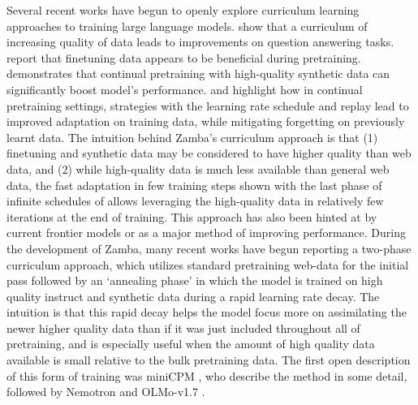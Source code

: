Several recent works have begun to openly explore curriculum learning approaches \citep{elman1993learning,bengio2009curriculum} to training large language models. \citet{liu2018curriculum} show that a curriculum of increasing quality of data leads to improvements on question answering tasks. \citet{krishna2023downstream} report that finetuning data appears to be beneficial during pretraining. \cite{gunasekar2023textbooks} demonstrates that continual pretraining with high-quality synthetic data can significantly boost model's performance.
\citet{gupta2023continual} and \citet{ibrahim2024simple} highlight how in continual pretraining settings, strategies with the learning rate schedule and replay lead to improved adaptation on training data, while mitigating forgetting on previously learnt data. The intuition behind Zamba's curriculum approach is that (1) finetuning and synthetic data may be considered to have higher quality than web data, and (2) while high-quality data is much less available than general web data, the fast adaptation in few training steps shown with the last phase of infinite schedules of \citet{ibrahim2024simple} allows leveraging the high-quality data in relatively few iterations at the end of training. This approach has also been hinted at by current frontier models \citep{team2024gemma,team2023gemini} or \citet{abdin2024phi} as a major method of improving performance. During the development of Zamba, many recent works have begun reporting a two-phase curriculum approach, which utilizes standard pretraining web-data for the initial pass followed by an `annealing phase' in which the model is trained on high quality instruct and synthetic data during a rapid learning rate decay. The intuition is that this rapid decay helps the model focus more on assimilating the newer higher quality data than if it was just included throughout all of pretraining, and is especially useful when the amount of high quality data available is small relative to the bulk pretraining data. The first open description of this form of training was miniCPM \citep{hu2024minicpm}, who describe the method in some detail, followed by Nemotron \citep{parmar2024nemotron} and OLMo-v1.7 \citep{olmo-1.7}.


